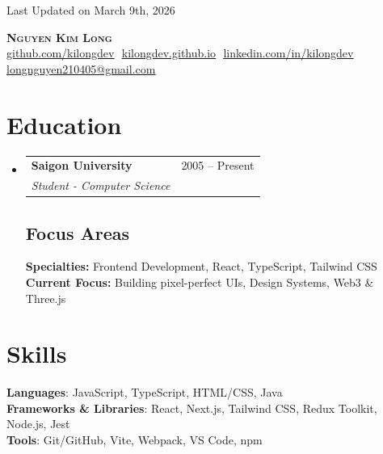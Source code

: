 \documentclass[letterpaper,11pt]{article}
\makeatletter
\newcommand{\resumeSubheading}[4]{
  \vspace{-2pt}\item
    \begin{tabular*}{0.97\textwidth}[t]{l@{\extracolsep{\fill}}r}
      \textbf{#1} & #2 \\
      \textit{\small#3} & \textit{\small #4} \\
    \end{tabular*}\vspace{-7pt}
}
\newcommand{\resumeSubHeadingListStart}{\begin{itemize}[leftmargin=0.15in, label={}]}
\newcommand{\resumeSubHeadingListEnd}{\end{itemize}}
\makeatother
\begin{document}
\begin{flushright}
  \color{gray}
  \item
  Last Updated on March 9th, 2026
\end{flushright}

\vspace{-5pt}

\begin{center}
    \textbf{\Huge \scshape Nguyen Kim Long} \\ \vspace{8pt}
    \small 
    \href{https://github.com/kilongdev}{\underline{github.com/kilongdev}} $  $
    \href{https://kilongdev.github.io}
    {\underline{kilongdev.github.io}} $  $
    \href{https://linkedin.com/in/kilongdev}{\underline{linkedin.com/in/kilongdev}} $  $
    \href{mailto:longnguyen210405@gmail.com}
    {\underline{longnguyen210405@gmail.com}}
\end{center}

\section{Education}
  \resumeSubHeadingListStart
  
    \resumeSubheading
      {Saigon University}{2005 -- Present}
      {Student - Computer Science}{}

    \vspace{-10pt}

    \subsection{Focus Areas}
      \textbf{Specialties:} Frontend Development, React, TypeScript, Tailwind CSS \\
      \textbf{Current Focus:} Building pixel-perfect UIs, Design Systems, Web3 \& Three.js

  \resumeSubHeadingListEnd

\section{Skills}
 \begin{itemize}[leftmargin=0.15in, label={}]
    \small{\item{
    
     \textbf{Languages}{: JavaScript, TypeScript, HTML/CSS, Java} \\
     
     \textbf{Frameworks \& Libraries}{: React, Next.js, Tailwind CSS, Redux Toolkit, Node.js, Jest} \\
     
     \textbf{Tools}{: Git/GitHub, Vite, Webpack, VS Code, npm}
     
    }}
 \end{itemize}
\end{document}
